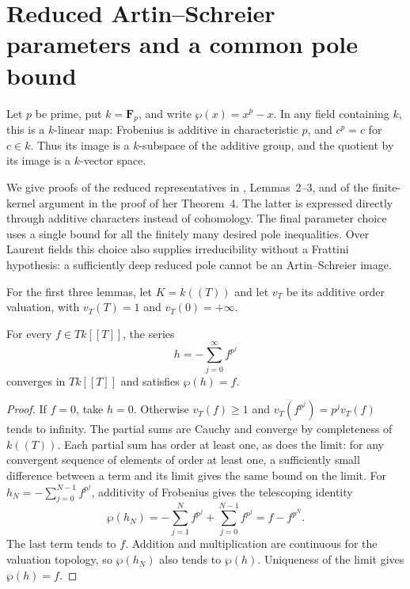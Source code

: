 \section{Reduced Artin--Schreier parameters and a common pole bound}

Let $p$ be prime, put $k=\mathbf F_p$, and write
$\wp(x)=x^p-x$. In any field containing $k$, this is a
$k$-linear map: Frobenius is additive in characteristic $p$,
and $c^p=c$ for $c\in k$. Thus its image is a $k$-subspace
of the additive group, and the quotient by its image is a
$k$-vector space.

We give proofs of the reduced representatives in
\cite{Camina1997}, Lemmas~2--3, and of the finite-kernel
argument in the proof of her Theorem~4. The latter is expressed
directly through additive characters instead of cohomology.
The final parameter choice uses a single bound for all the
finitely many desired pole inequalities. Over Laurent fields this
choice also supplies irreducibility without a Frattini hypothesis:
a sufficiently deep reduced pole cannot be an Artin--Schreier image.

For the first three lemmas, let $K=k((T))$ and let $v_T$ be
its additive order valuation, with $v_T(T)=1$ and
$v_T(0)=+\infty$.

\begin{lemma}
\label{lem:artin-schreier-positive-tail}
\leanok
For every $f\in T k[[T]]$, the series
\[
 h=-\sum_{j=0}^{\infty} f^{p^j}
\]
converges in $T k[[T]]$ and satisfies $\wp(h)=f$.
\end{lemma}

\begin{proof}
If $f=0$, take $h=0$. Otherwise $v_T(f)\ge1$ and
$v_T(f^{p^j})=p^jv_T(f)$ tends to infinity.
The partial sums are Cauchy and converge by completeness of
$k((T))$. Each partial sum has order at least one, as does
the limit: for any convergent sequence of elements of order
at least one, a sufficiently small difference between a term
and its limit gives the same bound on the limit.
For $h_N=-\sum_{j=0}^{N-1}f^{p^j}$, additivity of Frobenius
gives the telescoping identity
\[
 \wp(h_N)
   =-\sum_{j=1}^{N}f^{p^j}+\sum_{j=0}^{N-1}f^{p^j}
   =f-f^{p^N}.
\]
The last term tends to $f$. Addition and multiplication are
continuous for the valuation topology, so $\wp(h_N)$ also
tends to $\wp(h)$. Uniqueness of the limit gives
$\wp(h)=f$.
\end{proof}

